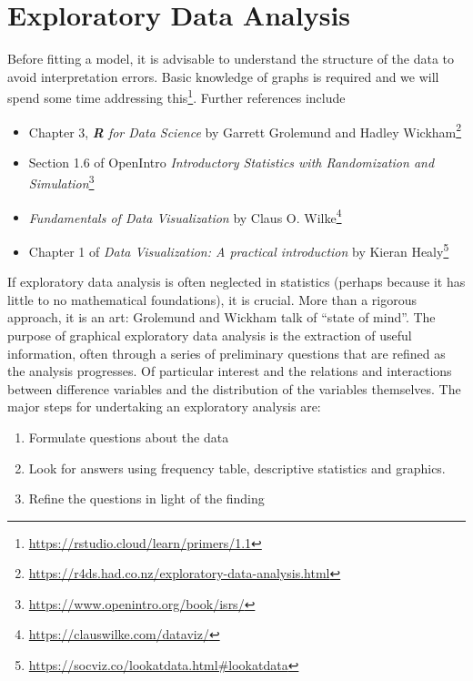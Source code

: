 \documentclass[
  11pt,
  letterpaper,
]{book}
\providecommand{\tightlist}{%
  \setlength{\itemsep}{0pt}\setlength{\parskip}{0pt}}
\renewcommand{\href}[2]{#2\footnote{\url{#1}}}
\theoremstyle{definition}
\theoremstyle{definition}
\theoremstyle{definition}
\theoremstyle{definition}
\theoremstyle{remark}
\begin{document}
\hypertarget{eda}{%
\section{Exploratory Data Analysis}\label{eda}}

Before fitting a model, it is advisable to understand the structure of the data to avoid interpretation errors. Basic knowledge of graphs is required and we will spend some time \href{https://rstudio.cloud/learn/primers/1.1}{addressing this}. Further references include

\begin{itemize}
\tightlist
\item
  \href{https://r4ds.had.co.nz/exploratory-data-analysis.html}{Chapter 3, \emph{\textbf{R} for Data Science} by Garrett Grolemund and Hadley Wickham}
\item
  \href{https://www.openintro.org/book/isrs/}{Section 1.6 of OpenIntro \emph{Introductory Statistics with Randomization and Simulation}}
\item
  \href{https://clauswilke.com/dataviz/}{\emph{Fundamentals of Data Visualization} by Claus O. Wilke}
\item
  \href{https://socviz.co/lookatdata.html\#lookatdata}{Chapter 1 of \emph{Data Visualization: A practical introduction} by Kieran Healy}
\end{itemize}

If exploratory data analysis is often neglected in statistics (perhaps because it has little to no mathematical foundations), it is crucial. More than a rigorous approach, it is an art: Grolemund and Wickham talk of ``state of mind''. The purpose of graphical exploratory data analysis is the extraction of useful information, often through a series of preliminary questions that are refined as the analysis progresses. Of particular interest and the relations and interactions between difference variables and the distribution of the variables themselves. The major steps for undertaking an exploratory analysis are:

\begin{enumerate}
\def\labelenumi{\arabic{enumi}.}
\tightlist
\item
  Formulate questions about the data
\item
  Look for answers using frequency table, descriptive statistics and graphics.
\item
  Refine the questions in light of the finding
\end{enumerate}
\end{document}
